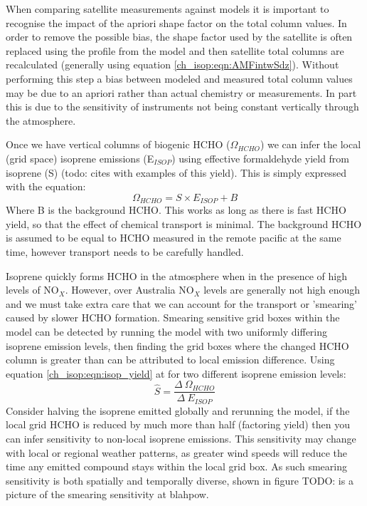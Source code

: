     When comparing satellite measurements against models it is important to recognise the impact of the apriori shape factor on the total column values.
    In order to remove the possible bias, the shape factor used by the satellite is often replaced using the profile from the model and then satellite total columns are recalculated (generally using equation \ref{ch_isop:eqn:AMFintwSdz}).
    Without performing this step a bias between modeled and measured total column values may be due to an apriori rather than actual chemistry or measurements.
    In part this is due to the sensitivity of instruments not being constant vertically through the atmosphere.
    
    Once we have vertical columns of biogenic HCHO ($\Omega_{HCHO}$) we can infer the local (grid space) isoprene emissions (E$_{ISOP}$) using effective formaldehyde yield from isoprene (S) (todo: cites with examples of this yield).
    This is simply expressed with the equation:
    \begin{equation} \label{ch_isop:eqn:isop_yield}
      \Omega_{HCHO} = S \times E_{ISOP} + B
    \end{equation}
    Where B is the background HCHO.
    This works as long as there is fast HCHO yield, so that the effect of chemical transport is minimal.
    The background HCHO is assumed to be equal to HCHO measured in the remote pacific at the same time, however transport needs to be carefully handled.
    
    Isoprene quickly forms HCHO in the atmosphere when in the presence of high levels of NO$_X$.
    However, over Australia NO$_X$ levels are generally not high enough and we must take extra care that we can account for the transport or 'smearing' caused by slower HCHO formation.
    Smearing sensitive grid boxes within the model can be detected by running the model with two uniformly differing isoprene emission levels, then finding the grid boxes where the changed HCHO column is greater than can be attributed to local emission difference.
    Using equation \ref{ch_isop:eqn:isop_yield} at for two different isoprene emission levels:
    \begin{equation*}
      \hat{S} = \frac{\Delta~\Omega_{HCHO}}{\Delta~E_{ISOP}}
    \end{equation*}
    Consider halving the isoprene emitted globally and rerunning the model, if the local grid HCHO is reduced by much more than half (factoring yield) then you can infer sensitivity to non-local isoprene emissions.
    This sensitivity may change with local or regional weather patterns, as greater wind speeds will reduce the time any emitted compound stays within the local grid box.
    As such smearing sensitivity is both spatially and temporally diverse, shown in figure TODO: is a picture of the smearing sensitivity at blahpow.
   

